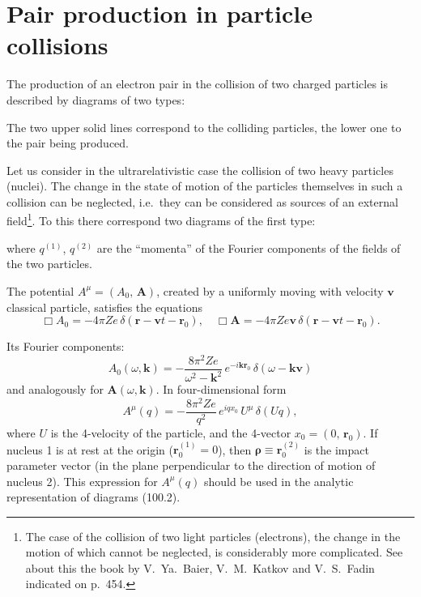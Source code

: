 
\section{Pair production in particle collisions}


The production of an electron pair in the collision of two charged particles is described by diagrams of two types:


The two upper solid lines correspond to the colliding particles, the lower one to the pair being produced.

Let us consider in the ultrarelativistic case the collision of two heavy particles (nuclei). The change in the state of motion of the particles themselves in such a collision can be neglected, i.e.\ they can be considered as sources of an external field\footnote{The case of the collision of two light particles (electrons), the change in the motion of which cannot be neglected, is considerably more complicated. See about this the book by V.~Ya.~Baier, V.~M.~Katkov and V.~S.~Fadin indicated on p.~454.}. To this there correspond two diagrams of the first type:


where $q^{(1)}$, $q^{(2)}$ are the ``momenta'' of the Fourier components of the fields of the two particles.

The potential $A^\mu = (A_0,\,\mathbf{A})$, created by a uniformly moving with velocity $\mathbf{v}$ classical particle, satisfies the equations
\[
\Box A_0 = -4\pi Ze\,\delta(\mathbf{r} - \mathbf{v}t - \mathbf{r}_0), \quad \Box\mathbf{A} = -4\pi Ze\mathbf{v}\,\delta(\mathbf{r} - \mathbf{v}t - \mathbf{r}_0).
\]

Its Fourier components:
\[
A_0(\omega,\mathbf{k}) = -\frac{8\pi^2 Ze}{\omega^2 - \mathbf{k}^2}\,e^{-i\mathbf{k}\mathbf{r}_0}\,\delta(\omega - \mathbf{k}\mathbf{v})
\]
and analogously for $\mathbf{A}(\omega,\mathbf{k})$. In four-dimensional form
\[
A^\mu(q) = -\frac{8\pi^2 Ze}{q^2}\,e^{iqx_0}\,U^\mu\,\delta(Uq),
\]
where $U$ is the 4-velocity of the particle, and the 4-vector $x_0 = (0,\,\mathbf{r}_0)$. If nucleus 1 is at rest at the origin ($\mathbf{r}_0^{(1)} = 0$), then $\boldsymbol{\rho} \equiv \mathbf{r}_0^{(2)}$ is the impact parameter vector (in the plane perpendicular to the direction of motion of nucleus 2). This expression for $A^\mu(q)$ should be used in the analytic representation of diagrams (100.2).

